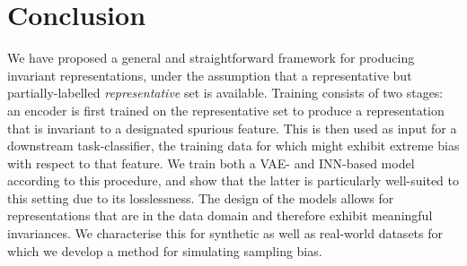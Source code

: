 \section{Conclusion}\label{sec:conclusion}
We have proposed a general and straightforward framework for producing invariant representations,
under the assumption that a representative but partially-labelled \emph{representative} set is
available. 
%
Training consists of two stages: an encoder is first trained on the representative set to produce a
representation that is invariant to a designated spurious feature. 
%
This is then used as input for a downstream task-classifier, the training data for which might
exhibit extreme bias with respect to that feature. 
%
We train both a \acs{VAE}- and \acs{INN}-based model according to this procedure, and show that the
latter is particularly well-suited to this setting due to its losslessness. 
%
The design of the models allows for representations that are in the data domain and
therefore exhibit meaningful invariances. 
%
We characterise this for synthetic as well as real-world
datasets for which we develop a method for simulating sampling bias.
